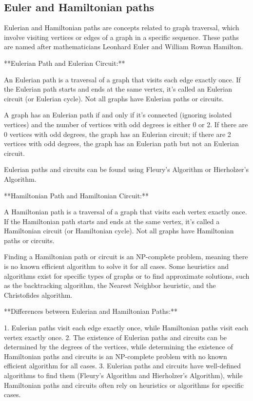 \documentclass{article}
\begin{document}
\subsection{Euler and Hamiltonian paths}

Eulerian and Hamiltonian paths are concepts related to graph traversal, which involve visiting vertices or edges of a graph in a specific sequence. These paths are named after mathematicians Leonhard Euler and William Rowan Hamilton.

**Eulerian Path and Eulerian Circuit:**

An Eulerian path is a traversal of a graph that visits each edge exactly once. If the Eulerian path starts and ends at the same vertex, it's called an Eulerian circuit (or Eulerian cycle). Not all graphs have Eulerian paths or circuits.

A graph has an Eulerian path if and only if it's connected (ignoring isolated vertices) and the number of vertices with odd degrees is either 0 or 2. If there are 0 vertices with odd degrees, the graph has an Eulerian circuit; if there are 2 vertices with odd degrees, the graph has an Eulerian path but not an Eulerian circuit.

Eulerian paths and circuits can be found using Fleury's Algorithm or Hierholzer's Algorithm.

**Hamiltonian Path and Hamiltonian Circuit:**

A Hamiltonian path is a traversal of a graph that visits each vertex exactly once. If the Hamiltonian path starts and ends at the same vertex, it's called a Hamiltonian circuit (or Hamiltonian cycle). Not all graphs have Hamiltonian paths or circuits.

Finding a Hamiltonian path or circuit is an NP-complete problem, meaning there is no known efficient algorithm to solve it for all cases. Some heuristics and algorithms exist for specific types of graphs or to find approximate solutions, such as the backtracking algorithm, the Nearest Neighbor heuristic, and the Christofides algorithm.

**Differences between Eulerian and Hamiltonian Paths:**

1. Eulerian paths visit each edge exactly once, while Hamiltonian paths visit each vertex exactly once.
2. The existence of Eulerian paths and circuits can be determined by the degrees of the vertices, while determining the existence of Hamiltonian paths and circuits is an NP-complete problem with no known efficient algorithm for all cases.
3. Eulerian paths and circuits have well-defined algorithms to find them (Fleury's Algorithm and Hierholzer's Algorithm), while Hamiltonian paths and circuits often rely on heuristics or algorithms for specific cases.
\end{document}
